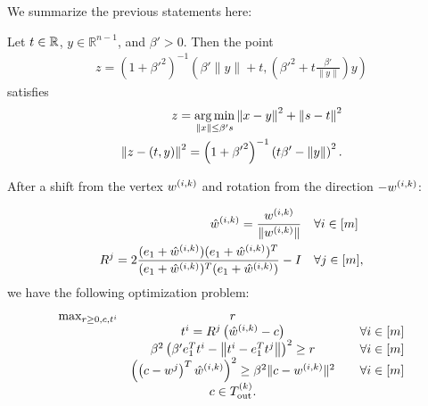 
We summarize the previous statements here:
\begin{lemma}

Let $t \in \mathbb R$, $y \in \mathbb R^{n-1}$, and $\beta' > 0$.
Then the point
\begin{align*}
z = \left(1 + {\beta'} ^ 2\right)^{-1} \left({\beta'} \|y\| + t, \left({\beta'} ^ 2 + t \frac {{\beta'}}{\|y\|}\right) y\right)
\end{align*}
satisfies
\begin{align*}
z = \operatorname*{arg\,min}_{\left\|x\right\| \le \beta' s} \left\|x - y\right\|^2 + \left\|s - t\right\|^2 \\
\left\|z - (t, y)\right\|^2 = \left(1 + {\beta'}^2\right)^{-1}\left(t \beta' - \left\|y\right\| \right)^2.
\end{align*}
\end{lemma}

After a shift from the vertex ${w^{(i, k)}}$ and rotation from the direction $-{w^{(i, k)}}$:

\begin{align*}
\hat w^{(i,k)} = \frac {{w^{(i, k)}}} {\|{w^{(i, k)}}\|} & \quad \forall i \in [m] \\
R^j = 2 \frac{(e_1 + \hat w^{(i,k)})(e_1 + \hat w^{(i,k)})^T}{(e_1 + \hat w^{(i,k)})^T(e_1 + \hat w^{(i,k)})} - I  & \quad \forall j \in [m],
\end{align*}
we have the following optimization problem:
\begin{align*}
\begin{array} {ccc}
\max_{r \ge 0, c, t^i}	& r & \\
					& t^i = R^j\left(\hat w^{(i,k)} - c\right) 									& \quad \forall i \in [m] \\
					& \beta^2 \left(\beta' e_1^T t^i - \left\|t^i - e_1^T t^j\right\|\right)^2 \ge r			& \quad \forall i \in [m] \\
					& \left(\left(c - w^j\right)^T\hat w^{(i,k)}\right)^2 \ge \beta^2 \|c - {w^{(i, k)}}\|^2		& \quad \forall i \in [m] \\
					& c \in {T_{\text{out}}^{(k)}}. &
\end{array}
\end{align*}

